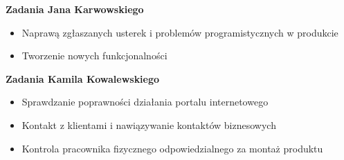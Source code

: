 \documentclass[../main.tex]{subfiles}
\begin{document}
{{        \noindent\textbf{Zadania Jana Karwowskiego}
        \begin{itemize}
            \item Naprawą zgłaszanych usterek i problemów programistycznych w produkcie
            \item Tworzenie nowych funkcjonalności
        \end{itemize}
        \bigskip

        \noindent\textbf{Zadania Kamila Kowalewskiego}
        \begin{itemize}
            \item Sprawdzanie poprawności działania portalu internetowego
            \item Kontakt z klientami i nawiązywanie kontaktów biznesowych
            \item Kontrola pracownika fizycznego odpowiedzialnego za montaż produktu
        \end{itemize}
        \bigskip
    }
}
\end{document}
